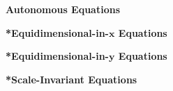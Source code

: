{%
\begin{large}
  \noindent
  \textbf{Autonomous Equations}
\end{large}



\begin{large}
  \noindent
  \textbf{*Equidimensional-in-$\mathbf{x}$ Equations}
\end{large}



\begin{large}
  \noindent
  \textbf{*Equidimensional-in-$\mathbf{y}$ Equations}
\end{large}



\begin{large}
  \noindent
  \textbf{*Scale-Invariant Equations}
\end{large}










\raggedbottom
}
